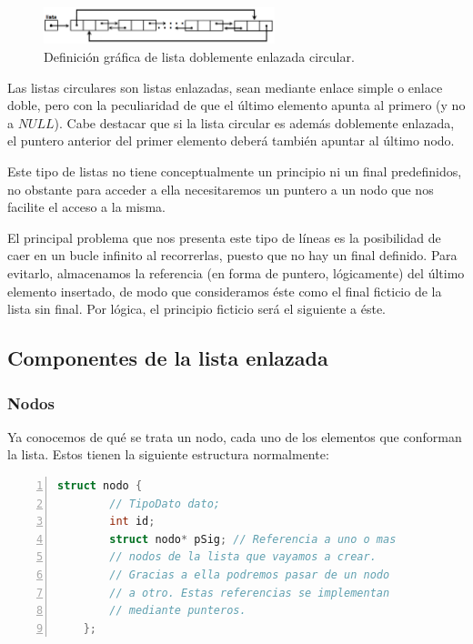 \documentclass[a4paper, 11pt, titlepage]{article}
\begin{document}
            \begin{figure}[htp]
                \centering
                \includegraphics[width=0.6\textwidth]{resources/listaenlazada02.png}
                \caption{Definición gráfica de lista doblemente enlazada circular.}
                \label{listaenlazada02circular}
            \end{figure}    

            Las listas circulares son listas enlazadas, sean mediante enlace simple o enlace doble, pero 
            con la peculiaridad de que el último elemento apunta al primero (y no a $NULL$). Cabe destacar 
            que si la lista circular es además doblemente enlazada, el puntero anterior del primer elemento 
            deberá también apuntar al último nodo.
    
            Este tipo de listas no tiene conceptualmente un principio ni un final predefinidos, no obstante
            para acceder a ella necesitaremos un puntero a un nodo que nos facilite el acceso a la misma.
    
            El principal problema que nos presenta este tipo de líneas es la posibilidad de caer en un 
            bucle infinito al recorrerlas, puesto que no hay un final definido. Para evitarlo, almacenamos 
            la referencia (en forma de puntero, lógicamente) del último elemento insertado, de modo que 
            consideramos éste como el final ficticio de la lista sin final. Por lógica, el principio 
            ficticio será el siguiente a éste.    

    \subsection{Componentes de la lista enlazada}

        \subsubsection{Nodos}

            Ya conocemos de qué se trata un nodo, cada uno de los elementos que conforman 
            la lista. Estos tienen la siguiente estructura normalmente:

            \begin{lstlisting}[language=C,numbers=left]
    struct nodo {
        // TipoDato dato;
        int id;
        struct nodo* pSig; // Referencia a uno o mas
        // nodos de la lista que vayamos a crear. 
        // Gracias a ella podremos pasar de un nodo 
        // a otro. Estas referencias se implementan 
        // mediante punteros.
    };\end{lstlisting}
\end{document}
